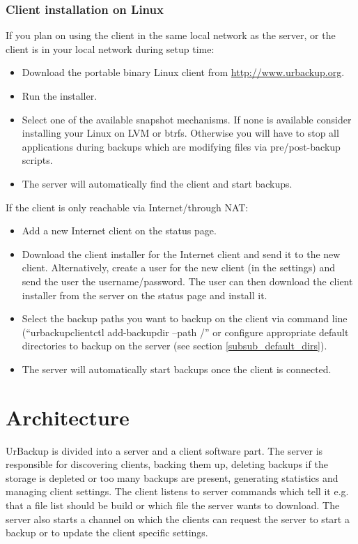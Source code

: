 \documentclass[a4paper,10pt]{article}
\begin{document}
\subsubsection{Client installation on Linux}

\noindent If you plan on using the client in the same local network as the server, or the client is in your local network during setup time:

\begin{itemize}
\item Download the portable binary Linux client from \url{http://www.urbackup.org}.
\item Run the installer.
\item Select one of the available snapshot mechanisms. If none is available consider installing your Linux on LVM or btrfs. Otherwise you will have to stop all applications during backups which are modifying files via pre/post-backup scripts.
\item The server will automatically find the client and start backups.
\end{itemize}

\noindent If the client is only reachable via Internet/through NAT:

\begin{itemize}
  \item Add a new Internet client on the status page.
  \item Download the client installer for the Internet client and send it to the new client. Alternatively, create a user for the new client (in the settings) and send the user the username/password. The user can then download the client installer from the server on the status page and install it.
  \item Select the backup paths you want to backup on the client via command line (``urbackupclientctl add-backupdir --path /'' or configure appropriate default directories to backup on the server (see section \ref{subsub_default_dirs}).
  \item The server will automatically start backups once the client is connected.
\end{itemize}

\section{Architecture}
\label{sec_architecture}

UrBackup is divided into a server and a client software part.
The server is responsible for discovering clients, backing them up, deleting
backups if the storage is depleted or too many backups are present, generating
statistics and managing client settings. The client
listens to server commands which tell it e.g. that a file list should be build
or which file the server wants to download. The server also starts a channel on
which the clients can request the server to start a backup or to update the
client specific settings.
\end{document}

